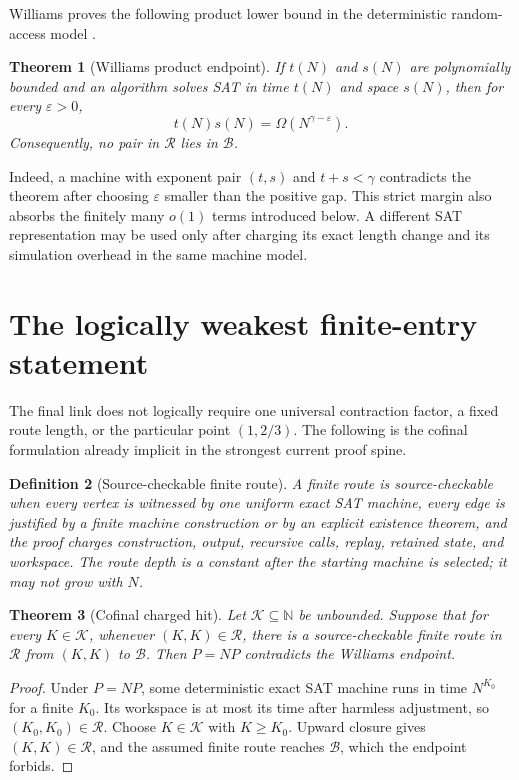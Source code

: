 \documentclass[11pt]{article}
\newtheorem{theorem}{Theorem}[section]
\newtheorem{definition}[theorem]{Definition}
\newcommand{\R}{\mathcal R}
\newcommand{\B}{\mathcal B}
\newcommand{\eps}{\varepsilon}
\begin{document}
Williams proves the following product lower bound in the deterministic
random-access model \cite[Theorem 3.9]{Williams2010}.

\begin{theorem}[Williams product endpoint]
If $t(N)$ and $s(N)$ are polynomially bounded and an algorithm solves SAT in
time $t(N)$ and space $s(N)$, then for every $\eps>0$,
\[
 t(N)s(N)=\Omega\!\left(N^{\gamma-\eps}\right).
\]
Consequently, no pair in $\R$ lies in $\B$.
\end{theorem}

Indeed, a machine with exponent pair $(t,s)$ and $t+s<\gamma$ contradicts the
theorem after choosing $\eps$ smaller than the positive gap.  This strict
margin also absorbs the finitely many $o(1)$ terms introduced below.  A
different SAT representation may be used only after charging its exact length
change and its simulation overhead in the same machine model.

\section{The logically weakest finite-entry statement}

The final link does not logically require one universal contraction factor, a
fixed route length, or the particular point $(1,2/3)$.  The following is the
cofinal formulation already implicit in the strongest current proof spine.

\begin{definition}[Source-checkable finite route]
A finite route is source-checkable when every vertex is witnessed by one
uniform exact SAT machine, every edge is justified by a finite machine
construction or by an explicit existence theorem, and the proof charges
construction, output, recursive calls, replay, retained state, and workspace.
The route depth is a constant after the starting machine is selected; it may
not grow with $N$.
\end{definition}

\begin{theorem}[Cofinal charged hit]
Let $\mathcal K\subseteq\mathbb N$ be unbounded.  Suppose that for every
$K\in\mathcal K$, whenever $(K,K)\in\R$, there is a source-checkable finite
route in $\R$ from $(K,K)$ to $\B$.  Then $P=NP$ contradicts the Williams
endpoint.
\end{theorem}

\begin{proof}
Under $P=NP$, some deterministic exact SAT machine runs in time $N^{K_0}$ for
a finite $K_0$.  Its workspace is at most its time after harmless adjustment,
so $(K_0,K_0)\in\R$.  Choose $K\in\mathcal K$ with $K\geq K_0$.  Upward
closure gives $(K,K)\in\R$, and the assumed finite route reaches $\B$, which
the endpoint forbids.
\end{proof}
\end{document}
